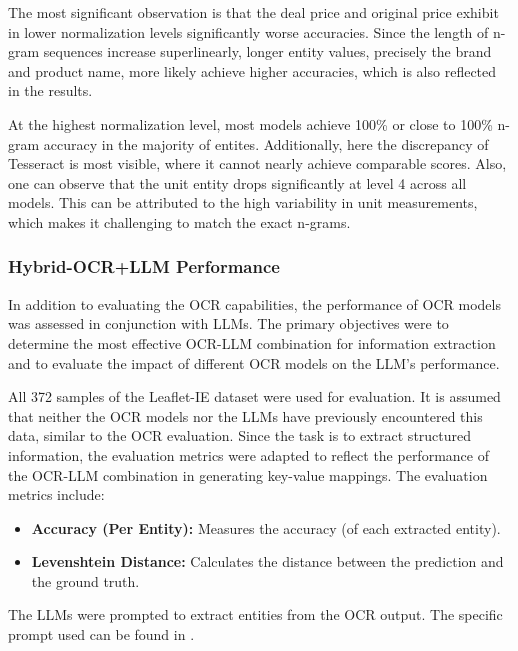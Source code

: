 \documentclass[11pt]{article}
\begin{document}
The most significant observation is that the deal price and original price exhibit in lower normalization levels significantly worse accuracies. Since the length of n-gram sequences increase superlinearly, longer entity values, precisely the brand and product name, more likely achieve higher accuracies, which is also reflected in the results.

At the highest normalization level, most models achieve 100\% or close to 100\% n-gram accuracy in the majority of entites. Additionally, here the discrepancy of Tesseract is most visible, where it cannot nearly achieve comparable scores. Also, one can observe that the unit entity drops significantly at level 4 across all models. This can be attributed to the high variability in unit measurements, which makes it challenging to match the exact n-grams.


\subsubsection{Hybrid-OCR+LLM Performance}

In addition to evaluating the OCR capabilities, the performance of OCR models was assessed in conjunction with LLMs. The primary objectives were to determine the most effective OCR-LLM combination for information extraction and to evaluate the impact of different OCR models on the LLM's performance.

All 372 samples of the Leaflet-IE dataset were used for evaluation. It is assumed that neither the OCR models nor the LLMs have previously encountered this data, similar to the OCR evaluation. Since the task is to extract structured information, the evaluation metrics were adapted to reflect the performance of the OCR-LLM combination in generating key-value mappings. The evaluation metrics include:
\begin{itemize}
    \item \textbf{Accuracy (Per Entity):} Measures the accuracy (of each extracted entity).
    \item \textbf{Levenshtein Distance:} Calculates the distance between the prediction and the ground truth.
\end{itemize}

The LLMs were prompted to extract entities from the OCR output. The specific prompt used can be found in .
\end{document}

